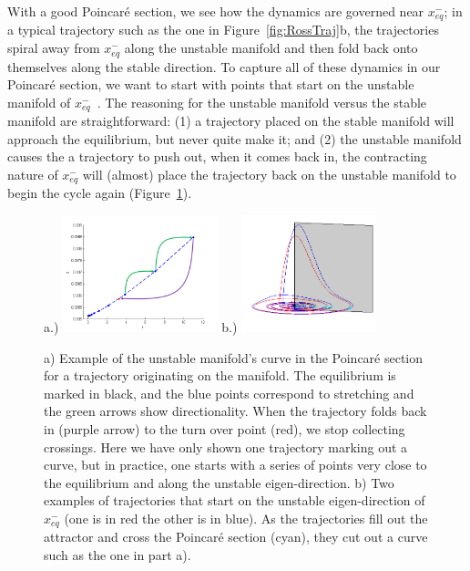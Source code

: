 \documentclass[10pt,letter]{article}
\begin{document}
With a good Poincar\'e section, we see how the dynamics are governed near
$x_{eq}^{-}$; in a typical trajectory such as the one in
Figure~\ref{fig:RossTraj}b, the trajectories spiral away from
$x_{eq}^{-}$ along the unstable manifold and then fold back onto
themselves along the stable direction.  To capture all of these dynamics
in our Poincar\'e section, we want to start with points that start on the
unstable manifold of $x_{eq}^{-}$~\cite{Eth}.  The reasoning for the
unstable manifold versus the stable manifold are straightforward: (1) a
trajectory placed on the stable manifold will approach the equilibrium,
but never quite make it; and (2) the unstable manifold causes the a
trajectory to push out, when it comes back in, the contracting nature of
$x_{eq}^{-}$ will (almost) place the trajectory back on the unstable
manifold to begin the cycle again (Figure~\ref{fig:RossUnstable}).
\begin{figure}[h]
\centering
a.)  \includegraphics[width=0.40\textwidth]
      {Figs/Section1/kcsinglettrajectoryalongPSdirection.png}
b.)  \includegraphics[width=0.35\textwidth]
                     {Figs/Section1/kcRosslerUnstableManPSc.png}
\caption{
a) Example of the unstable manifold's curve in the Poincar\'e section for
a trajectory originating on the manifold.  The equilibrium is marked in
black, and the blue points correspond to stretching and the green arrows
show directionality.  When the trajectory folds back in (purple arrow) to
the turn over point (red), we stop collecting crossings.  Here we have
only shown one trajectory marking out a curve, but in practice, one
starts with a series of points very close to the equilibrium and along
the unstable eigen-direction.
b) Two examples of trajectories that start on the unstable
eigen-direction of $x_{eq}^{-}$ (one is in red the other is in blue). As
the trajectories fill out the attractor and cross the Poincar\'e section
(cyan), they cut out a curve such as the one in part a).
}
 \label{fig:RossUnstable}
\end{figure}
\end{document}
